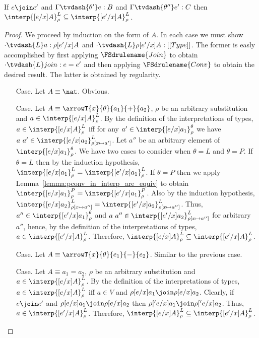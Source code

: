 \begin{lemma}
  \label{lemma:lconv_in_interp_are_equiv}
  If $e \join e'$ and $\Gamma \tvdash{\theta'} e:B$ and $\Gamma \tvdash{\theta''} e':C$ then 
  $\interp{[e/x]A}^L_\rho \subseteq \interp{[e'/x]A}^L_\rho$.
\end{lemma}
\begin{proof}
  We proceed by induction on the form of $A$.  In each case we must show 
  $\cdot \tvdash{L} a:\rho[e'/x]A$ and $\cdot \tvdash{L} \rho[e'/x]A:[[Type]]$.  The former is easly 
  accomplished by first applying $\FSdrulename{Join}$ to obtain $\cdot \tvdash{L} join:e = e'$ 
  and then applying $\FSdrulename{Conv}$ to obtain the desired result.  The latter is obtained
  by regularity.
  
  \begin{itemize}
  \item[Case.] Let $A \equiv \nat$.  Obvious.
    
  \item[Case.] Let $A \equiv \arrowT{x}{\theta}{a_1}{+}{a_2}$, $\rho$ be an arbitrary 
    substitution and $a \in \interp{[e/x]A}^L_\rho$.  By the definition of the interpretations 
    of types,
    $a \in \interp{[e/x]A}^L_\rho$ iff for any 
    $a' \in \interp{[e/x]a_1}^\theta_\rho$ we have
    $a\ a' \in \interp{[e/x]a_2}^L_{\rho[x \mapsto a']}$.
    Let $a''$ be an arbitrary element of $\interp{[e/x]a_1}^\theta_\rho$. We have two cases
    to consider when $\theta = L$ and $\theta = P$.  If $\theta = L$ then by the induction 
    hypothesis, 
    $\interp{[e/x]a_1}^L_\rho = \interp{[e'/x]a_1}^L_\rho$.  
    If $\theta = P$ then we apply  
    Lemma~\ref{lemma:pconv_in_interp_are_equiv} to obtain 
    $\interp{[e/x]a_1}^P_\rho = \interp{[e'/x]a_1}^P_\rho$.
    Also by the induction hypothesis,
    $\interp{[e/x]a_2}^L_{\rho[x \mapsto a'']} = \interp{[e'/x]a_2}^L_{\rho[x \mapsto a'']}$.  
    Thus, 
    $a'' \in \interp{[e'/x]a_1}^\theta_\rho$ and
    $a\ a'' \in \interp{[e'/x]a_2}^L_{\rho[x \mapsto a'']}$ for arbitrary $a''$, hence,
    by the definition of the interpretations of types,
    $a \in \interp{[e'/x]A}^L_\rho$.  Therefore, 
    $\interp{[e/x]A}^L_\rho \subseteq \interp{[e'/x]A}^L_\rho$.
    
  \item[Case.]  Let $A \equiv \arrowT{x}{\theta}{e_1}{-}{e_2}$.  Similar to the previous case.
    
  \item[Case.] Let $A \equiv a_1 = a_2$, $\rho$ be an arbitrary 
    substitution and $a \in \interp{[e/x]A}^L_\rho$.
    By the definition of the interpretations of types,
    $a \in \interp{[e/x]A}^L_\rho$ iff $a \in V$ and 
    $\rho[e/x]a_1 \join \rho[e/x]a_2$.
    Clearly, if $e \join e'$ and $\rho[e/x]a_1 \join \rho[e/x]a_2$ then 
    $\rho['e/x]a_1 \join \rho['e/x]a_2$.
    Thus, $a \in \interp{[e'/x]A}^L_\rho$.  Therefore,
    $\interp{[e/x]A}^L_\rho \subseteq \interp{[e'/x]A}^L_\rho$.
  \end{itemize}
\end{proof}
